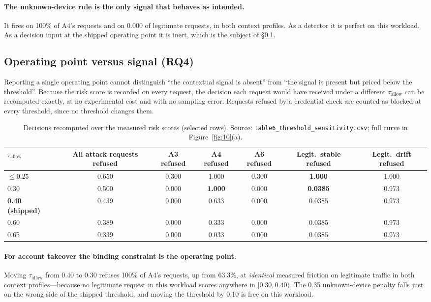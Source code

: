 \paragraph{The unknown-device rule is the only signal that behaves as intended.} It fires on 100\% of A4's requests and on 0.000 of legitimate requests, in both context profiles. As a detector it is perfect on this workload. As a decision input at the shipped operating point it is inert, which is the subject of \S\ref{sec:res-threshold}.

\subsection{Operating point versus signal (RQ4)}
\label{sec:res-threshold}

Reporting a single operating point cannot distinguish ``the contextual signal is absent'' from ``the signal is present but priced below the threshold''. Because the risk score is recorded on every request, the decision each request would have received under a different $\tau_{\mathrm{allow}}$ can be recomputed exactly, at no experimental cost and with no sampling error. Requests refused by a credential check are counted as blocked at every threshold, since no threshold changes them.

\setcounter{table}{5}
\begin{table}[t]
\centering
\caption{Decisions recomputed over the measured risk scores (selected rows). Source: \texttt{table6\_threshold\_sensitivity.csv}; full curve in Figure~\ref{fig:10}(a).}
\label{tab:6}
\small
\begin{tabular}{lcccccc}
\toprule
$\tau_{\mathrm{allow}}$ & All attack requests refused & A3 refused & A4 refused & A6 refused & Legit.\ stable refused & Legit.\ drift refused \\
\midrule
$\leq 0.25$ & 0.650 & 0.300 & 1.000 & 0.300 & \textbf{1.000} & 1.000 \\
0.30 & 0.500 & 0.000 & \textbf{1.000} & 0.000 & \textbf{0.0385} & 0.973 \\
\textbf{0.40 (shipped)} & 0.439 & 0.000 & 0.633 & 0.000 & 0.0385 & 0.973 \\
0.60 & 0.389 & 0.000 & 0.333 & 0.000 & 0.0385 & 0.973 \\
0.65 & 0.339 & 0.000 & 0.033 & 0.000 & 0.0385 & 0.973 \\
\bottomrule
\end{tabular}
\end{table}

\paragraph{For account takeover the binding constraint is the operating point.} Moving $\tau_{\mathrm{allow}}$ from 0.40 to 0.30 refuses 100\% of A4's requests, up from 63.3\%, at \textit{identical} measured friction on legitimate traffic in both context profiles---because no legitimate request in this workload scores anywhere in $[0.30, 0.40)$. The 0.35 unknown-device penalty falls just on the wrong side of the shipped threshold, and moving the threshold by 0.10 is free on this workload.

